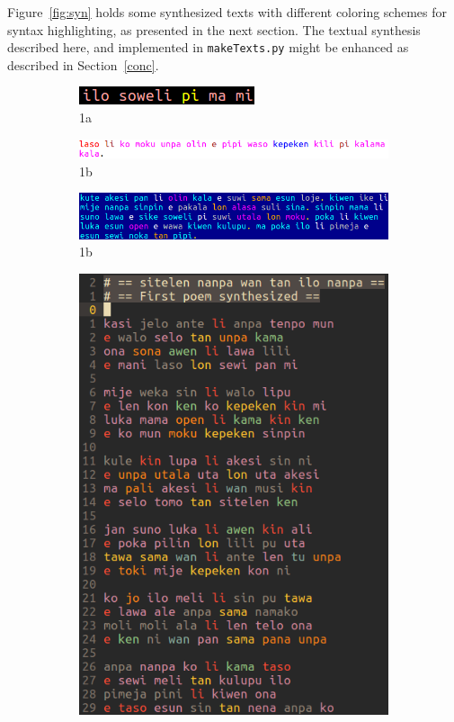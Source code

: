 \documentclass{article}
\newcommand{\tttt}[1]{\texttt{#1}}
\begin{document}
Figure~\ref{fig:syn} holds some synthesized texts
with different coloring schemes for syntax highlighting,
as presented in the next section.
The textual synthesis described here,
and implemented in \tttt{makeTexts.py}
might be enhanced as described in Section~\ref{conc}.

\begin{figure}
  \begin{subfigure}{.5\textwidth}
    \centering
        \includegraphics[width=.8\linewidth]{figs/phrase_}
          \caption{1a}
            \label{fig:sfig1}
  \end{subfigure}%
  \begin{subfigure}{.5\textwidth}
    \centering
        \includegraphics[width=.8\linewidth]{figs/sentence_}
          \caption{1b}
            \label{fig:sfig2}
  \end{subfigure}
  \begin{subfigure}{.5\textwidth}
    \centering
        \includegraphics[width=.8\linewidth]{figs/paragraph_}
          \caption{1b}
            \label{fig:sfig2}
  \end{subfigure}
  \begin{subfigure}{.5\textwidth}
    \centering
        \includegraphics[width=.8\linewidth]{figs/poem_}

\end{subfigure}
\end{figure}
\end{document}
